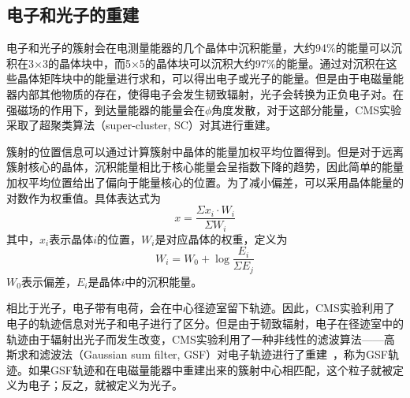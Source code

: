 \subsection{电子和光子的重建}\label{subsec:EGReco}

电子和光子的簇射会在电测量能器的几个晶体中沉积能量，大约94\%的能量可以沉积在3$\times$3的晶体块中，而5$\times$5的晶体块可以沉积大约97\%的能量。通过对沉积在这些晶体矩阵块中的能量进行求和，可以得出电子或光子的能量。但是由于电磁量能器内部其他物质的存在，使得电子会发生韧致辐射，光子会转换为正负电子对。在强磁场的作用下，到达量能器的能量会在$\phi$角度发散，对于这部分能量，CMS实验采取了超聚类算法（super-cluster, SC）对其进行重建。

簇射的位置信息可以通过计算簇射中晶体的能量加权平均位置得到。但是对于远离簇射核心的晶体，沉积能量相比于核心能量会呈指数下降的趋势，因此简单的能量加权平均位置给出了偏向于能量核心的位置。为了减小偏差，可以采用晶体能量的对数作为权重值。具体表达式为
\begin{equation}
    x=\frac{\Sigma x_{i} \cdot W_{i}}{\Sigma W_{i}}
\end{equation}
其中，$x_{i}$表示晶体$i$的位置，$W_{i}$是对应晶体的权重，定义为
\begin{equation}
    W_{i}=W_{0}+\log \frac{E_{i}}{\Sigma E_{j}}
\end{equation}
$W_{0}$表示偏差，$E_{i}$是晶体$i$中的沉积能量。

相比于光子，电子带有电荷，会在中心径迹室留下轨迹。因此，CMS实验利用了电子的轨迹信息对光子和电子进行了区分。但是由于韧致辐射，电子在径迹室中的轨迹由于辐射出光子而发生改变，CMS实验利用了一种非线性的滤波算法——高斯求和滤波法（Gaussian sum filter, GSF）对电子轨迹进行了重建~\cite{adam2005reconstruction}，称为GSF轨迹。如果GSF轨迹和在电磁量能器中重建出来的簇射中心相匹配，这个粒子就被定义为电子；反之，就被定义为光子。

